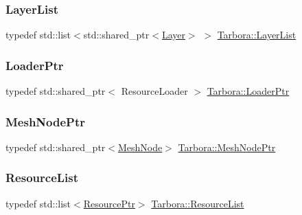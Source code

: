 \subsubsection{\texorpdfstring{Layer\+List}{LayerList}}
{\footnotesize\ttfamily typedef std\+::list$<$std\+::shared\+\_\+ptr$<$\hyperlink{classTarbora_1_1Layer}{Layer}$>$ $>$ \hyperlink{namespaceTarbora_aee2ef7c48625ede704b0513d7fe097e3}{Tarbora\+::\+Layer\+List}}

\mbox{\label{namespaceTarbora_a9778d3976ea45923cf1d59f95972ce7f}} 
\subsubsection{\texorpdfstring{Loader\+Ptr}{LoaderPtr}}
{\footnotesize\ttfamily typedef std\+::shared\+\_\+ptr$<$ Resource\+Loader $>$ \hyperlink{namespaceTarbora_a9778d3976ea45923cf1d59f95972ce7f}{Tarbora\+::\+Loader\+Ptr}}

\mbox{\label{namespaceTarbora_a2b0f11b1d7dcdb105476d7168fdc8f26}} 
\subsubsection{\texorpdfstring{Mesh\+Node\+Ptr}{MeshNodePtr}}
{\footnotesize\ttfamily typedef std\+::shared\+\_\+ptr$<$\hyperlink{classTarbora_1_1MeshNode}{Mesh\+Node}$>$ \hyperlink{namespaceTarbora_a2b0f11b1d7dcdb105476d7168fdc8f26}{Tarbora\+::\+Mesh\+Node\+Ptr}}

\mbox{\label{namespaceTarbora_a5cddf1696a474301ef4d142bb262c30f}} 
\subsubsection{\texorpdfstring{Resource\+List}{ResourceList}}
{\footnotesize\ttfamily typedef std\+::list$<$\hyperlink{namespaceTarbora_ae7879d11814e081a1e13e25a669c9164}{Resource\+Ptr}$>$ \hyperlink{namespaceTarbora_a5cddf1696a474301ef4d142bb262c30f}{Tarbora\+::\+Resource\+List}}

\mbox{\label{namespaceTarbora_adcb77cac4f2f18382b073dd119314450}} 

